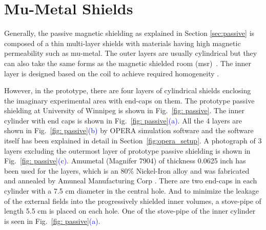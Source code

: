 \section{Mu-Metal Shields}\label{sec:shield}
Generally, the passive magnetic shielding as explained in Section \ref{sec:passive} is composed of a thin multi-layer shields with materials having high magnetic permeability such as mu-metal. The outer layers are usually cylindrical \cite{mu_cyl_1,mu_cyl_2} but they can also take the same forms as the magnetic shielded room (msr)~\cite{mu_msr_1,mu_msr_2}. The inner layer is designed based on the coil to achieve required homogeneity \cite{mu_inner_1,mu_inner_2}. 



However, in the prototype, there are four layers of cylindrical shields enclosing the imaginary experimental area with end-caps on them. The prototype passive shielding at University of Winnipeg is shown in Fig.~\ref{fig: passive}. The inner cylinder with end caps is shown in Fig.~\ref{fig: passive}\textcolor{blue}{(a)}. All the 4 layers are shown in Fig.~\ref{fig: passive}\textcolor{blue}{(b)} by OPERA simulation software and the software itself has been explained in detail in Section~\ref{fig:opera_setup}. A photograph of 3 layers excluding the outermost layer of prototype passive shielding is shown in Fig.~\ref{fig: passive}\textcolor{blue}{(c)}. Amumetal (Magnifer 7904) of thickness 0.0625 inch has been used for the layers,  which is an 80\% Nickel-Iron alloy and was fabricated and annealed by Amuneal Manufacturing Corp \cite{mu-metal}.  There are two end-caps in each cylinder with a 7.5 cm diameter in the central hole. And to minimize the leakage of the external fields into the progressively shielded inner volumes, a stove-pipe of length 5.5 cm is placed on each hole. One of the stove-pipe of the inner cylinder is seen in Fig.~\ref{fig: passive}\textcolor{blue}{(a)}.


